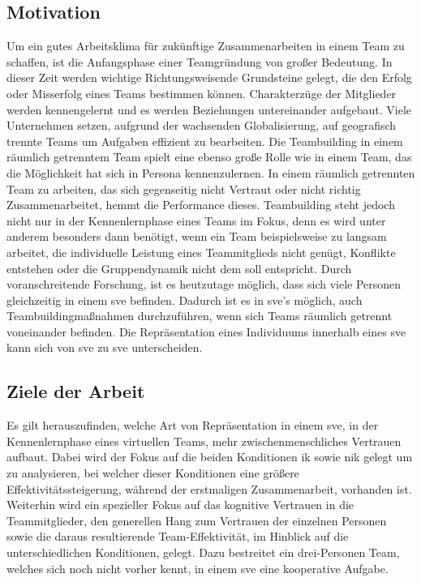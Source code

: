 \documentclass[a4paper,11pt]{article}%
\renewcommand{\\}{\vspace*{0.5\baselineskip} \newline}
\begin{document}
	\subsection{Motivation}
	Um ein gutes Arbeitsklima für zukünftige Zusammenarbeiten in einem Team zu schaffen, ist die Anfangsphase einer Teamgründung von großer Bedeutung. In dieser Zeit werden wichtige Richtungsweisende Grundsteine gelegt, die den Erfolg oder Misserfolg eines Teams bestimmen können. Charakterzüge der Mitglieder werden kennengelernt und es werden Beziehungen untereinander aufgebaut. \\	
	Viele Unternehmen setzen, aufgrund der wachsenden Globalisierung, auf geografisch trennte Teams um Aufgaben effizient zu bearbeiten. Die Teambuilding in einem räumlich getrenntem Team spielt eine ebenso große Rolle wie in einem Team, das die Möglichkeit hat sich in Persona kennenzulernen. \\
	In einem räumlich getrennten Team zu arbeiten, das sich gegenseitig nicht Vertraut oder nicht richtig Zusammenarbeitet, hemmt die Performance dieses. \citep[p. 98-107]{huang1998supporting} \citep[p. 399-417]{turoff1993distributed} \\	
	Teambuilding steht jedoch nicht nur in der Kennenlernphase eines Teams im Fokus, denn es wird unter anderem besonders dann benötigt, wenn ein Team beispielsweise zu langsam arbeitet, die individuelle Leistung eines Teammitglieds nicht genügt, Konflikte entstehen oder die Gruppendynamik nicht dem soll entspricht. \citep[p. 1-3]{biech2007pfeiffer}\\
	Durch voranschreitende Forschung, ist es heutzutage möglich, dass sich viele Personen gleichzeitig in einem \ac{sve} befinden. Dadurch ist es in \ac{sve}'s möglich, auch Teambuildingmaßnahmen durchzuführen, wenn sich Teams räumlich getrennt voneinander befinden.\\
	Die Repräsentation eines Individuums innerhalb eines \ac{sve} kann sich von \ac{sve} zu \ac{sve} unterscheiden.
	
	\subsection{Ziele der Arbeit}
Es gilt herauszufinden, welche Art von Repräsentation in einem \ac{sve}, in der \dq{}Kennenlernphase\dq{} eines virtuellen Teams, mehr zwischenmenschliches Vertrauen aufbaut. Dabei wird der Fokus auf die beiden Konditionen \ac{ik} sowie \ac{nik} gelegt um zu analysieren, bei welcher dieser Konditionen eine größere Effektivitätssteigerung, während der erstmaligen Zusammenarbeit, vorhanden ist.
Weiterhin wird ein spezieller Fokus auf das kognitive Vertrauen in die Teammitglieder, den generellen Hang zum Vertrauen der einzelnen Personen sowie die daraus resultierende Team-Effektivität, im Hinblick auf die unterschiedlichen Konditionen, gelegt. Dazu bestreitet ein drei-Personen Team, welches sich noch nicht vorher kennt, in einem \ac{sve} eine kooperative Aufgabe.
\end{document}
